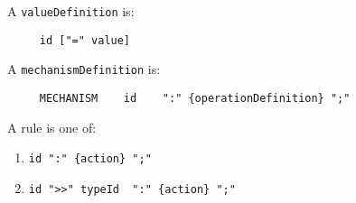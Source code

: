 A {\tt valueDefinition} is:
\begin{tscreen}
\begin{verbatim}
     id ["=" value]
\end{verbatim}
\end{tscreen}


A {\tt mechanismDefinition} is:
\begin{tscreen}
\begin{verbatim}
     MECHANISM    id    ":" {operationDefinition} ";"
\end{verbatim}
\end{tscreen}


A rule is one of:
\begin{enumerate}
\item 
\begin{verbatim}
id ":" {action} ";"
\end{verbatim}
\item 
\begin{verbatim}
id ">>" typeId  ":" {action} ";"
\end{verbatim}
\end{enumerate}


